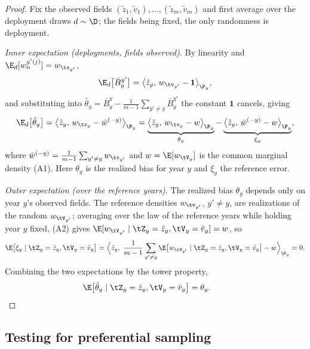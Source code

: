 \begin{proof}
Fix the observed fields $(\tilde z_1, \tilde v_1), \ldots, (\tilde z_m, \tilde v_m)$
and first average over the deployment draws $d \sim \D$; the fields being fixed,
the only randomness is deployment.

\emph{Inner expectation (deployments, fields observed).}
By linearity and $\E_d[w_n^{y'(j)}] = w_{\tv_{y'}}$,
\begin{equation}
  \E_d\big[\bar B_y^{y'}\big]
  = \big\langle \tilde z_y,\, w_{\tv_{y'}} - \mathbf 1\big\rangle_{\P_y},
\end{equation}
and substituting into
$\hat\theta_y = \bar B_y^{y} - \frac{1}{m-1}\sum_{y'\ne y}\bar B_y^{y'}$ the
constant $\mathbf 1$ cancels, giving
\begin{equation}
  \E_d\big[\hat\theta_y\big]
  = \big\langle \tilde z_y,\, w_{\tv_y} - \bar w^{(-y)}\big\rangle_{\P_y}
  = \underbrace{\big\langle \tilde z_y,\, w_{\tv_y} - w\big\rangle_{\P_y}}_{\theta_y}
    - \underbrace{\big\langle \tilde z_y,\, \bar w^{(-y)} - w\big\rangle_{\P_y}}_{\xi_y},
\end{equation}
where $\bar w^{(-y)} = \frac{1}{m-1}\sum_{y'\ne y} w_{\tv_{y'}}$ and
$w = \E[w_{\tV_y}]$ is the common marginal density (A1). Here $\theta_y$ is the
realized bias for year $y$ and $\xi_y$ the reference error.

\emph{Outer expectation (over the reference years).}
The realized bias $\theta_y$ depends only on year $y$'s observed fields. The
reference densities $w_{\tv_{y'}}$, $y'\ne y$, are realizations of the random
$w_{\tV_{y'}}$; averaging over the law of the reference years while holding year
$y$ fixed, (A2) gives $\E[w_{\tV_{y'}} \mid \tZ_y = \tilde z_y, \tV_y = \tilde v_y] = w$,
so
\begin{equation}
  \E\big[\xi_y \mid \tZ_y = \tilde z_y, \tV_y = \tilde v_y\big]
  = \Big\langle \tilde z_y,\;
      \frac{1}{m-1}\sum_{y'\ne y}\E\big[w_{\tV_{y'}} \mid \tZ_y=\tilde z_y,\tV_y=\tilde v_y\big] - w
    \Big\rangle_{\P_y} = 0.
\end{equation}
Combining the two expectations by the tower property,
\begin{equation}
  \E\big[\hat\theta_y \mid \tZ_y = \tilde z_y, \tV_y = \tilde v_y\big]
  = \theta_y. \qquad\qedhere
\end{equation}
\end{proof}

\subsection{Testing for preferential sampling}
\label{sec:test}

